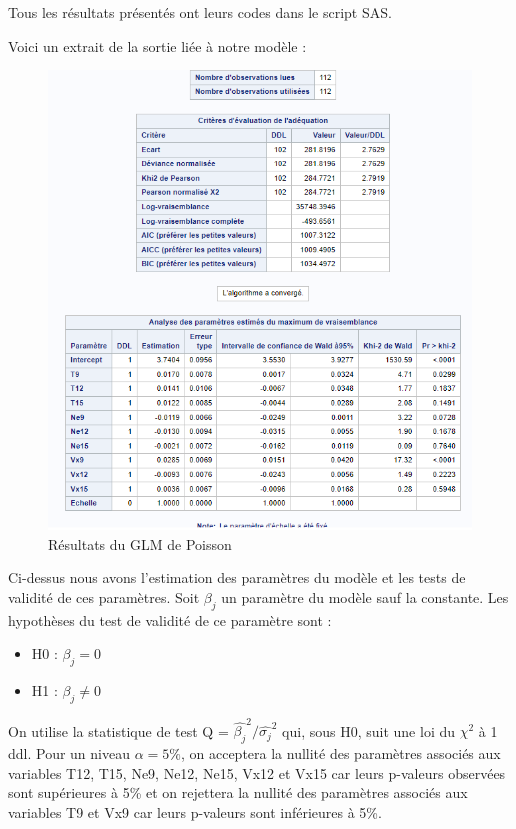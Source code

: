 \documentclass[12pt,a4paper]{article}
\begin{document}
Tous les résultats présentés ont leurs codes dans le script SAS.

Voici un extrait de la sortie liée à notre modèle :

\begin{figure}[H]
	\centering
	\includegraphics[width=\textwidth]{Sortie_GLM.PNG}
	\caption{Résultats du GLM de Poisson}
	\label{fig:resultats_glm_poisson}
\end{figure}

Ci-dessus nous avons l'estimation des paramètres du modèle et les tests de validité de ces paramètres.
Soit $\beta_j$ un paramètre du modèle sauf la constante. Les hypothèses du test de validité de ce paramètre sont :

\begin{itemize}
	\item H0 : $\beta_j = 0$
	\item H1 : $\beta_j \neq 0$
\end{itemize}

On utilise la statistique de test Q = $\hat{\beta_j}^2/\hat{\sigma_j}^2$ qui, sous H0, suit une loi du $\chi^2$ à 1 ddl.
Pour un niveau $\alpha=5\%$, on acceptera la nullité des paramètres associés aux variables T12, T15, Ne9, Ne12, Ne15, Vx12 et Vx15 car leurs p-valeurs observées sont supérieures à 5\% et on rejettera la nullité des paramètres associés aux variables T9 et Vx9 car leurs p-valeurs sont inférieures à 5\%.
\end{document}
